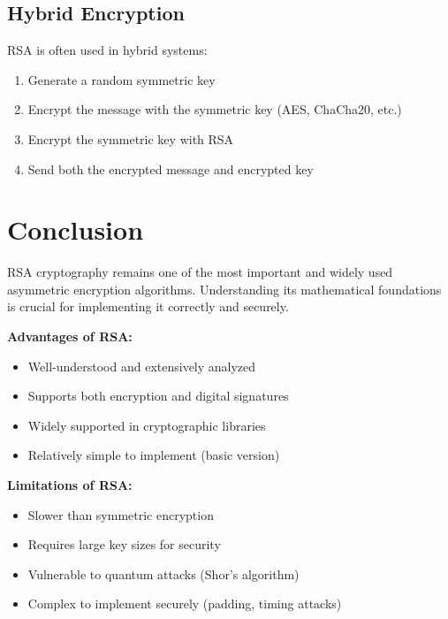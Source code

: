 \documentclass[11pt,a4paper]{article}
\begin{document}
\subsection{Hybrid Encryption}

RSA is often used in hybrid systems:

\begin{enumerate}
    \item Generate a random symmetric key
    \item Encrypt the message with the symmetric key (AES, ChaCha20, etc.)
    \item Encrypt the symmetric key with RSA
    \item Send both the encrypted message and encrypted key
\end{enumerate}

\section{Conclusion}

RSA cryptography remains one of the most important and widely used asymmetric encryption algorithms. Understanding its mathematical foundations is crucial for implementing it correctly and securely.

\begin{prosbox}
\textbf{Advantages of RSA:}
\begin{itemize}
    \item Well-understood and extensively analyzed
    \item Supports both encryption and digital signatures
    \item Widely supported in cryptographic libraries
    \item Relatively simple to implement (basic version)
\end{itemize}
\end{prosbox}

\begin{consbox}
\textbf{Limitations of RSA:}
\begin{itemize}
    \item Slower than symmetric encryption
    \item Requires large key sizes for security
    \item Vulnerable to quantum attacks (Shor's algorithm)
    \item Complex to implement securely (padding, timing attacks)
\end{itemize}
\end{consbox}
\end{document}
